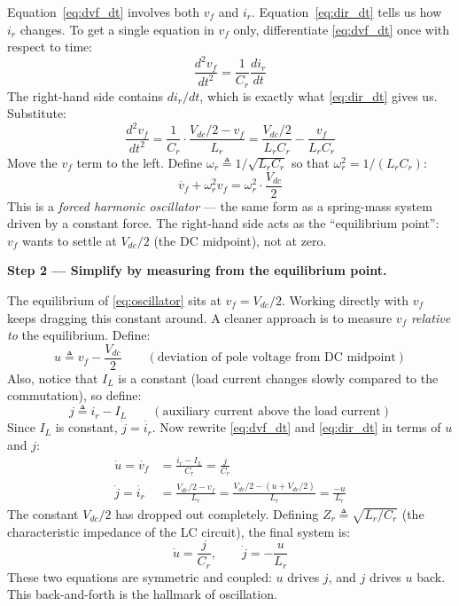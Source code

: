 \documentclass[12pt, a4paper]{article}
\def\,{ }%
\newcommand{\Vdc}{V_{dc}}
\newcommand{\vf}{v_f}
\newcommand{\ir}{i_r}
\newcommand{\IL}{I_L}
\newcommand{\Lr}{L_r}
\newcommand{\Cr}{C_r}
\newcommand{\omegar}{\omega_r}
\newcommand{\Zr}{Z_r}
\begin{document}
\begin{eqnbox}
Equation~\eqref{eq:dvf_dt} involves both $\vf$ and $\ir$.
Equation~\eqref{eq:dir_dt} tells us how $\ir$ changes.
To get a single equation in $\vf$ only, differentiate
\eqref{eq:dvf_dt} once with respect to time:
\begin{equation*}
    \frac{d^2\vf}{dt^2} = \frac{1}{\Cr}\,\frac{d\ir}{dt}
\end{equation*}
The right-hand side contains $d\ir/dt$, which is exactly what
\eqref{eq:dir_dt} gives us.  Substitute:
\begin{equation*}
    \frac{d^2\vf}{dt^2}
        = \frac{1}{\Cr}\cdot\frac{\Vdc/2 - \vf}{\Lr}
        = \frac{\Vdc/2}{\Lr\Cr} - \frac{\vf}{\Lr\Cr}
\end{equation*}
Move the $\vf$ term to the left.  Define $\omegar \triangleq 1/\sqrt{\Lr\Cr}$
so that $\omegar^2 = 1/(\Lr\Cr)$:
\begin{equation}
    \ddot{\vf} + \omegar^2\,\vf = \omegar^2\cdot\frac{\Vdc}{2}
    \label{eq:oscillator}
\end{equation}
This is a \emph{forced harmonic oscillator} — the same form as a
spring-mass system driven by a constant force.  The right-hand side acts
as the ``equilibrium point'': $\vf$ wants to settle at $\Vdc/2$
(the DC midpoint), not at zero.

\medskip
\textbf{Step 2 — Simplify by measuring from the equilibrium point.}

The equilibrium of \eqref{eq:oscillator} sits at $\vf = \Vdc/2$.
Working directly with $\vf$ keeps dragging this constant around.
A cleaner approach is to measure $\vf$ \emph{relative to} the equilibrium.
Define:
\begin{equation*}
    u \triangleq \vf - \frac{\Vdc}{2}
    \qquad (\text{deviation of pole voltage from DC midpoint})
\end{equation*}
Also, notice that $\IL$ is a constant (load current changes slowly compared
to the commutation), so define:
\begin{equation*}
    j \triangleq \ir - \IL
    \qquad (\text{auxiliary current above the load current})
\end{equation*}
Since $\IL$ is constant, $\dot{j} = \dot{\ir}$.
Now rewrite \eqref{eq:dvf_dt} and \eqref{eq:dir_dt} in terms of $u$ and $j$:
\begin{align*}
    \dot{u} = \dot{\vf}
        &= \frac{\ir - \IL}{\Cr} = \frac{j}{\Cr} \\[6pt]
    \dot{j} = \dot{\ir}
        &= \frac{\Vdc/2 - \vf}{\Lr}
         = \frac{\Vdc/2 - (u + \Vdc/2)}{\Lr}
         = \frac{-u}{\Lr}
\end{align*}
The constant $\Vdc/2$ has dropped out completely.
Defining $\Zr \triangleq \sqrt{\Lr/\Cr}$ (the characteristic impedance of
the LC circuit), the final system is:
\begin{equation}
    \dot{u} = \frac{j}{\Cr}, \qquad \dot{j} = -\frac{u}{\Lr}
    \label{eq:shifted_states}
\end{equation}
These two equations are symmetric and coupled: $u$ drives $j$, and
$j$ drives $u$ back. This back-and-forth is the hallmark of oscillation.


\end{eqnbox}
\end{document}
